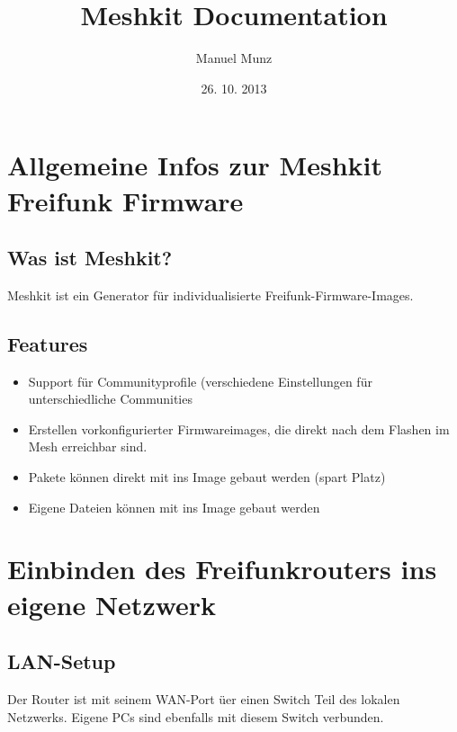 \documentclass[a4paper,12pt,ngerman]{sphinxmanual}
\title{Meshkit Documentation}
\date{26. 10. 2013}
\author{Manuel Munz}
\begin{document}
\maketitle
\tableofcontents
{}\label{index::doc}



\chapter{Allgemeine Infos zur Meshkit Freifunk Firmware}
\label{about:dokumentation-zu-meshkit}\label{about::doc}\label{about:allgemeine-infos-zur-meshkit-freifunk-firmware}\label{about:id1}

\section{Was ist Meshkit?}
\label{about:was-ist-meshkit}
Meshkit ist ein Generator für individualisierte Freifunk-Firmware-Images.


\section{Features}
\label{about:features}\begin{itemize}
\item {} 
Support für Communityprofile (verschiedene Einstellungen für unterschiedliche Communities

\item {} 
Erstellen vorkonfigurierter Firmwareimages, die direkt nach dem Flashen im Mesh erreichbar sind.

\item {} 
Pakete können direkt mit ins Image gebaut werden (spart Platz)

\item {} 
Eigene Dateien können mit ins Image gebaut werden

\end{itemize}


\chapter{Einbinden des Freifunkrouters ins eigene Netzwerk}
\label{get/integration-into-networks:einbinden-des-freifunkrouters-ins-eigene-netzwerk}\label{get/integration-into-networks::doc}

\section{LAN-Setup}
\label{get/integration-into-networks:lan-setup}
Der Router ist mit seinem WAN-Port üer einen Switch Teil des lokalen
Netzwerks. Eigene PCs sind ebenfalls mit diesem Switch verbunden.
\end{document}
